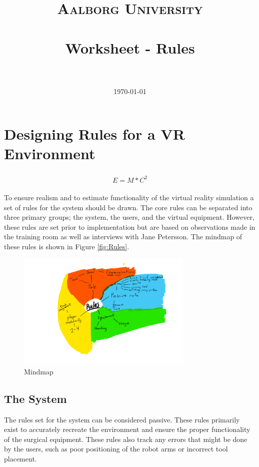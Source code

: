 \documentclass[paper=a4, fontsize=11pt]{scrartcl} %
\title{	
\normalfont \normalsize 
\textsc{Aalborg University} \\ [25pt] %
\horrule{0.5pt} \\[0.4cm] %
\huge Worksheet - Rules \\ %
\horrule{2pt} \\[0.5cm] %
}
\date{\normalsize\today} %
\numberwithin{equation}{section} %
\numberwithin{figure}{section} %
\numberwithin{table}{section} %
\begin{document}
\maketitle %


\section{Designing Rules for a VR Environment}


\begin{align} 
\begin{split}
E = M * C^2
\end{split}					
\end{align}

To ensure realism and to estimate functionality of the virtual reality simulation a set of rules for the system should be drawn. The core rules can be separated into three primary groups; the system, the users, and the virtual equipment. However, these rules are set prior to implementation but are based on observations made in the training room as well as interviews with Jane Petersson. The mindmap of these rules is shown in Figure  \autoref{fig:Rules}.

\begin{figure}[H]
\centering
\includegraphics[width=0.75\textwidth]{BSR}
\caption{Mindmap}
\label{fig:Rules}
\end{figure}

\subsection{The System}
The rules set for the system can be considered passive. These rules primarily exist to accurately recreate the environment and ensure the proper functionality of the surgical equipment. These rules also track any errors that might be done by the users, such as poor positioning of the robot arms or incorrect tool placement.
\end{document}
